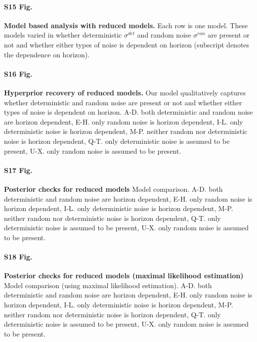 \documentclass[12pt]{article}
\begin{document}
{\paragraph*{S15 Fig.}
\label{S15_Fig}
{\bf Model based analysis with reduced models.} Each row is one model. These models varied in whether deterministic $\sigma^{det}$ and random noise $\sigma^{ran}$ are present or not and whether either types of noise is dependent on horizon (subscript denotes the dependence on horizon). 

\paragraph*{S16 Fig.}
\label{S16_Fig}
{\bf Hyperprior recovery of reduced models.} Our model qualitatively captures whether deterministic and random noise are present or not and whether either types of noise is dependent on horizon. A-D. both deterministic and random noise are horizon dependent, E-H. only random noise is horizon dependent, I-L. only deterministic noise is horizon dependent, M-P. neither random nor deterministic noise is horizon dependent, Q-T. only deterministic noise is assumed to be present, U-X. only random noise is assumed to be present.

\paragraph*{S17 Fig.}
\label{S17_Fig}
{\bf Posterior checks for reduced models}
Model comparison. A-D. both deterministic and random noise are horizon dependent, E-H. only random noise is horizon dependent, I-L. only deterministic noise is horizon dependent, M-P. neither random nor deterministic noise is horizon dependent, Q-T. only deterministic noise is assumed to be present, U-X. only random noise is assumed to be present.

\paragraph*{S18 Fig.}
\label{S18_Fig}
{\bf Posterior checks for reduced models (maximal likelihood estimation)}
Model comparison (using maximal likelihood estimation). A-D. both deterministic and random noise are horizon dependent, E-H. only random noise is horizon dependent, I-L. only deterministic noise is horizon dependent, M-P. neither random nor deterministic noise is horizon dependent, Q-T. only deterministic noise is assumed to be present, U-X. only random noise is assumed to be present.
	
}
\end{document}
